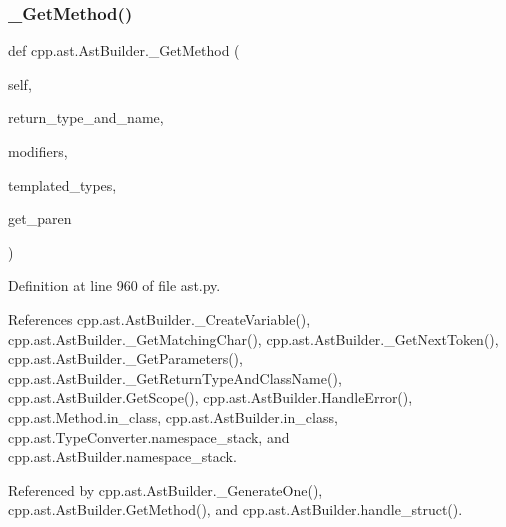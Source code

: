 \mbox{\label{classcpp_1_1ast_1_1AstBuilder_ad1d43eb0d4bdc6be1a9d7ff86c54bd66}} 
\subsubsection{\texorpdfstring{\+\_\+\+Get\+Method()}{\_GetMethod()}}
{\footnotesize\ttfamily def cpp.\+ast.\+Ast\+Builder.\+\_\+\+Get\+Method (\begin{DoxyParamCaption}\item[{}]{self,  }\item[{}]{return\+\_\+type\+\_\+and\+\_\+name,  }\item[{}]{modifiers,  }\item[{}]{templated\+\_\+types,  }\item[{}]{get\+\_\+paren }\end{DoxyParamCaption})\hspace{0.3cm}{\ttfamily [private]}}



Definition at line 960 of file ast.\+py.



References cpp.\+ast.\+Ast\+Builder.\+\_\+\+Create\+Variable(), cpp.\+ast.\+Ast\+Builder.\+\_\+\+Get\+Matching\+Char(), cpp.\+ast.\+Ast\+Builder.\+\_\+\+Get\+Next\+Token(), cpp.\+ast.\+Ast\+Builder.\+\_\+\+Get\+Parameters(), cpp.\+ast.\+Ast\+Builder.\+\_\+\+Get\+Return\+Type\+And\+Class\+Name(), cpp.\+ast.\+Ast\+Builder.\+Get\+Scope(), cpp.\+ast.\+Ast\+Builder.\+Handle\+Error(), cpp.\+ast.\+Method.\+in\+\_\+class, cpp.\+ast.\+Ast\+Builder.\+in\+\_\+class, cpp.\+ast.\+Type\+Converter.\+namespace\+\_\+stack, and cpp.\+ast.\+Ast\+Builder.\+namespace\+\_\+stack.



Referenced by cpp.\+ast.\+Ast\+Builder.\+\_\+\+Generate\+One(), cpp.\+ast.\+Ast\+Builder.\+Get\+Method(), and cpp.\+ast.\+Ast\+Builder.\+handle\+\_\+struct().


